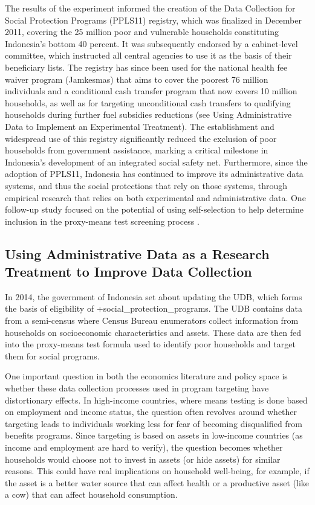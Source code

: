 \documentclass[
]{book}
\begin{document}
The results of the experiment informed the creation of the Data Collection for Social Protection Programs (PPLS11) registry, which was finalized in December 2011, covering the 25 million poor and vulnerable households constituting Indonesia's bottom 40 percent. It was subsequently endorsed by a cabinet-level committee, which instructed all central agencies to use it as the basis of their beneficiary lists. The registry has since been used for the national health fee waiver program (Jamkesmas) that aims to cover the poorest 76 million individuals and a conditional cash transfer program that now covers 10 million households, as well as for targeting unconditional cash transfers to qualifying households during further fuel subsidies reductions (see Using Administrative Data to Implement an Experimental Treatment). The establishment and widespread use of this registry significantly reduced the exclusion of poor households from government assistance, marking a critical milestone in Indonesia's development of an integrated social safety net. Furthermore, since the adoption of PPLS11, Indonesia has continued to improve its administrative data systems, and thus the social protections that rely on those systems, through empirical research that relies on both experimental and administrative data. One follow-up study focused on the potential of using self-selection to help determine inclusion in the proxy-means test screening process \citep{alatas2016}.

\hypertarget{using-administrative-data-as-a-research-treatment-to-improve-data-collection}{%
\subsection{Using Administrative Data as a Research Treatment to Improve Data Collection}\label{using-administrative-data-as-a-research-treatment-to-improve-data-collection}}

In 2014, the government of Indonesia set about updating the UDB, which forms the basis of eligibility of +social\_protection\_programs\textbar. The UDB contains data from a semi-census where Census Bureau enumerators collect information from households on socioeconomic characteristics and assets. These data are then fed into the proxy-means test formula used to identify poor households and target them for social programs.

One important question in both the economics literature and policy space is whether these data collection processes used in program targeting have distortionary effects. In high-income countries, where means testing is done based on employment and income status, the question often revolves around whether targeting leads to individuals working less for fear of becoming disqualified from benefits programs. Since targeting is based on assets in low-income countries (as income and employment are hard to verify), the question becomes whether households would choose not to invest in assets (or hide assets) for similar reasons. This could have real implications on household well-being, for example, if the asset is a better water source that can affect health or a productive asset (like a cow) that can affect household consumption.
\end{document}
